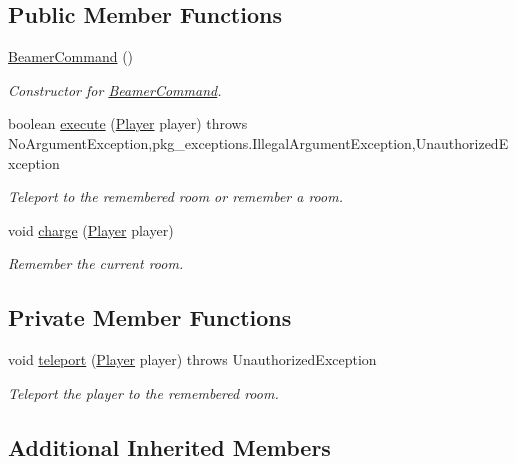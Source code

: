 \subsection*{Public Member Functions}
\begin{DoxyCompactItemize}
\item 
\hyperlink{classpkg__commands_1_1BeamerCommand_a541cd046e7680452f451322c1730e675}{Beamer\-Command} ()
\begin{DoxyCompactList}\small\item\em Constructor for \hyperlink{classpkg__commands_1_1BeamerCommand}{Beamer\-Command}. \end{DoxyCompactList}\item 
boolean \hyperlink{classpkg__commands_1_1BeamerCommand_a139dc852e180cabd8af15cfed37dcf0e}{execute} (\hyperlink{classpkg__world_1_1Player}{Player} player)  throws No\-Argument\-Exception,pkg\-\_\-exceptions.\-Illegal\-Argument\-Exception,\-Unauthorized\-Exception 
\begin{DoxyCompactList}\small\item\em Teleport to the remembered room or remember a room. \end{DoxyCompactList}\item 
void \hyperlink{classpkg__commands_1_1BeamerCommand_ae71665296a18d581ad1f714c1078e37b}{charge} (\hyperlink{classpkg__world_1_1Player}{Player} player)
\begin{DoxyCompactList}\small\item\em Remember the current room. \end{DoxyCompactList}\end{DoxyCompactItemize}
\subsection*{Private Member Functions}
\begin{DoxyCompactItemize}
\item 
void \hyperlink{classpkg__commands_1_1BeamerCommand_a2b6c04242d443d4ff36f255b06ce14be}{teleport} (\hyperlink{classpkg__world_1_1Player}{Player} player)  throws Unauthorized\-Exception 
\begin{DoxyCompactList}\small\item\em Teleport the player to the remembered room. \end{DoxyCompactList}\end{DoxyCompactItemize}
\subsection*{Additional Inherited Members}


